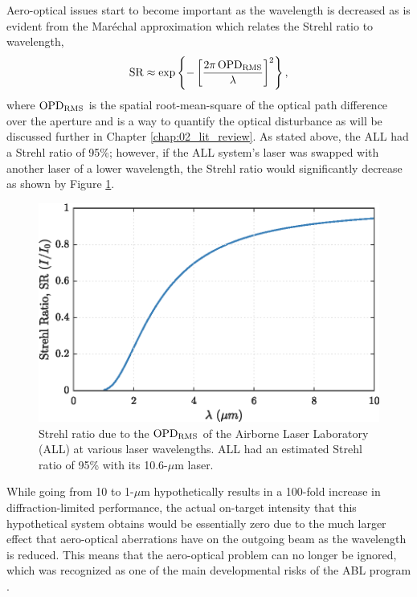 Aero-optical issues start to become important as the wavelength is decreased as is evident from the Mar\'echal approximation \cite{Mahajan-1983-hg7ahvJM} which relates the Strehl ratio to wavelength,
\begin{equation}
  \operatorname{SR} \approx \exp\left\{-\left[\frac{2\pi \operatorname{OPD_{RMS}}}{\lambda}\right]^2\right\} \textrm{,}
  \label{eqn:01_strehl_ratio}
\end{equation}
where $\operatorname{OPD_{RMS}}$ is the spatial root-mean-square of the optical path difference over the aperture and is a way to quantify the optical disturbance as will be discussed further in Chapter \ref{chap:02_lit_review}.
As stated above, the ALL had a Strehl ratio of 95\%; however, if the ALL system's laser was swapped with another laser of a lower wavelength, the Strehl ratio would significantly decrease as shown by Figure \ref{fig:01_strehl_ratio}.
\begin{figure}
  \centering
  \includegraphics{../matlab/01_introduction/strehl_ratio.eps}
  \caption{Strehl ratio due to the $\operatorname{OPD_{RMS}}$ of the Airborne Laser Laboratory (ALL) at various laser wavelengths.  ALL had an estimated Strehl ratio of 95\% with its 10.6-$\mu$m laser.}
  \label{fig:01_strehl_ratio}
\end{figure}
While going from 10 to 1-$\mu$m hypothetically results in a 100-fold increase in diffraction-limited performance, the actual on-target intensity that this hypothetical system obtains would be essentially zero due to the much larger effect that aero-optical aberrations have on the outgoing beam as the wavelength is reduced.
This means that the aero-optical problem can no longer be ignored, which was recognized as one of the main developmental risks of the ABL program \cite{DOTE-1999-HnkadUEw}.


